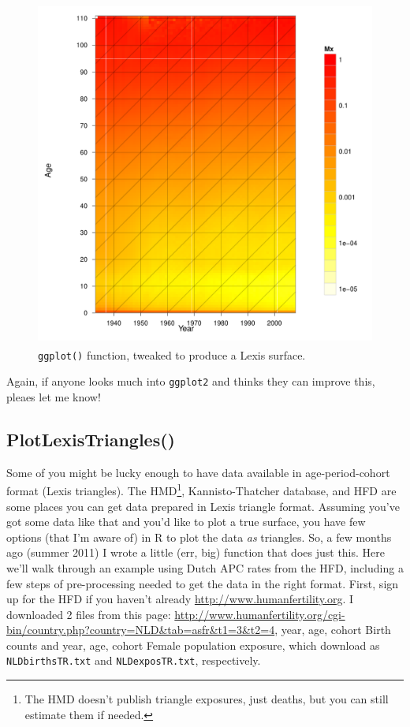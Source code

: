 \documentclass[a4paper]{article}
\begin{document}
\begin{figure}[H]
\centering
\includegraphics[width=4.5in,height=4.5in]{figs/ggplot2surface.pdf}
\caption{\texttt{ggplot()} function, tweaked to produce a Lexis surface.}
\end{figure}

Again, if anyone looks much into \texttt{ggplot2} and thinks they can improve this, pleaes let me know!
\subsection{PlotLexisTriangles()}
Some of you might be lucky enough to have data available in age-period-cohort format (Lexis triangles). The HMD\footnote{The HMD doesn't publish triangle exposures, just deaths, but you can still estimate them if needed.}, Kannisto-Thatcher database, and HFD are some places you can get data prepared in Lexis triangle format. Assuming you've got some data like that and you'd like to plot a true surface, you have few options (that I'm aware of) in R to plot the data \textit{as} triangles. So, a few months ago (summer 2011) I wrote a little (err, big) function that does just this. Here we'll walk through an example using Dutch APC rates from the HFD, including a few steps of pre-processing needed to get the data in the right format. First, sign up for the HFD if you haven't already \url{http://www.humanfertility.org}. I downloaded 2 files from this page: \url{http://www.humanfertility.org/cgi-bin/country.php?country=NLD&tab=asfr&t1=3&t2=4}, year, age, cohort Birth counts and year, age, cohort Female population exposure, which download as \texttt{NLDbirthsTR.txt} and \texttt{NLDexposTR.txt}, respectively.
\end{document}
